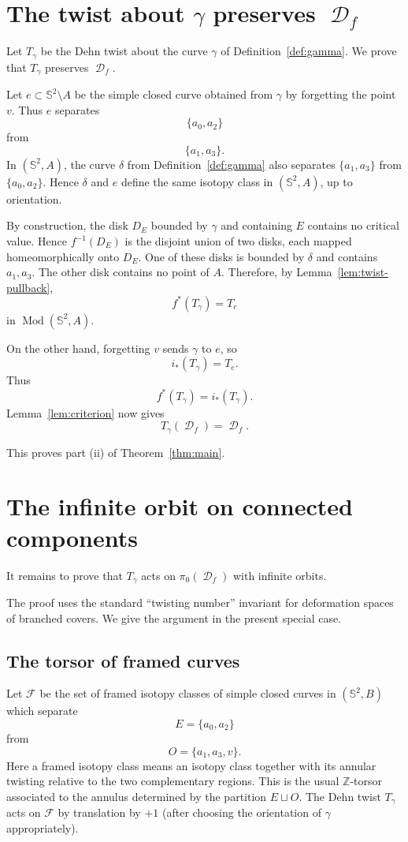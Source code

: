 \documentclass[11pt]{article}
\theoremstyle{plain}
\theoremstyle{definition}
\DeclareMathOperator{\Mod}{Mod}
\DeclareMathOperator{\D}{\mathcal D}
\newcommand{\Sph}{\mathbb S^2}
\begin{document}
\section{The twist about \(\gamma\) preserves \(\D_f\)}

Let \(T_\gamma\) be the Dehn twist about the curve \(\gamma\) of Definition~\ref{def:gamma}. We prove that \(T_\gamma\) preserves \(\D_f\).

Let \(e\subset\Sph\setminus A\) be the simple closed curve obtained from \(\gamma\) by forgetting the point \(v\). Thus \(e\) separates
\[
\{a_0,a_2\}
\]
from
\[
\{a_1,a_3\}.
\]
In \((\Sph,A)\), the curve \(\delta\) from Definition~\ref{def:gamma} also separates \(\{a_1,a_3\}\) from \(\{a_0,a_2\}\). Hence \(\delta\) and \(e\) define the same isotopy class in \((\Sph,A)\), up to orientation.

By construction, the disk \(D_E\) bounded by \(\gamma\) and containing \(E\) contains no critical value. Hence \(f^{-1}(D_E)\) is the disjoint union of two disks, each mapped homeomorphically onto \(D_E\). One of these disks is bounded by \(\delta\) and contains \(a_1,a_3\). The other disk contains no point of \(A\). Therefore, by Lemma~\ref{lem:twist-pullback},
\[
f^*(T_\gamma)=T_e
\]
in \(\Mod(\Sph,A)\).

On the other hand, forgetting \(v\) sends \(\gamma\) to \(e\), so
\[
i_*(T_\gamma)=T_e.
\]
Thus
\[
f^*(T_\gamma)=i_*(T_\gamma).
\]
Lemma~\ref{lem:criterion} now gives
\[
T_\gamma(\D_f)=\D_f.
\]

This proves part (ii) of Theorem~\ref{thm:main}.

\section{The infinite orbit on connected components}

It remains to prove that \(T_\gamma\) acts on \(\pi_0(\D_f)\) with infinite orbits.

The proof uses the standard ``twisting number'' invariant for deformation spaces of branched covers. We give the argument in the present special case.

\subsection{The torsor of framed curves}

Let \(\mathcal F\) be the set of framed isotopy classes of simple closed curves in \((\Sph,B)\) which separate
\[
E=\{a_0,a_2\}
\]
from
\[
O=\{a_1,a_3,v\}.
\]
Here a framed isotopy class means an isotopy class together with its annular twisting relative to the two complementary regions. This is the usual \(\mathbb Z\)-torsor associated to the annulus determined by the partition \(E\sqcup O\). The Dehn twist \(T_\gamma\) acts on \(\mathcal F\) by translation by \(+1\) (after choosing the orientation of \(\gamma\) appropriately).
\end{document}
